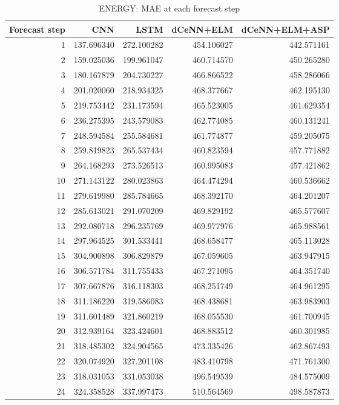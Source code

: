 \begin{table}
\caption{ENERGY: MAE at each forecast step}
\begin{tabular}{rrrrr}
\toprule
Forecast step & CNN & LSTM & dCeNN+ELM & dCeNN+ELM+ASP \\
\midrule
1 & 137.696340 & 272.100282 & 454.106027 & 442.571161 \\
2 & 159.025036 & 199.961047 & 460.714570 & 450.265280 \\
3 & 180.167879 & 204.730227 & 466.866522 & 458.286066 \\
4 & 201.020060 & 218.934325 & 468.377667 & 462.195130 \\
5 & 219.753442 & 231.173594 & 465.523005 & 461.629354 \\
6 & 236.275395 & 243.579083 & 462.774085 & 460.131241 \\
7 & 248.594584 & 255.584681 & 461.774877 & 459.205075 \\
8 & 259.819823 & 265.537434 & 460.823594 & 457.771882 \\
9 & 264.168293 & 273.526513 & 460.995083 & 457.421862 \\
10 & 271.143122 & 280.023863 & 464.474294 & 460.536662 \\
11 & 279.619980 & 285.784665 & 468.392170 & 464.201207 \\
12 & 285.613021 & 291.070209 & 469.829192 & 465.577607 \\
13 & 292.080718 & 296.235769 & 469.977976 & 465.988561 \\
14 & 297.964525 & 301.533441 & 468.658477 & 465.113028 \\
15 & 304.900898 & 306.829879 & 467.059605 & 463.947915 \\
16 & 306.571784 & 311.755433 & 467.271095 & 464.351740 \\
17 & 307.667876 & 316.118303 & 468.251749 & 464.961295 \\
18 & 311.186220 & 319.586083 & 468.438681 & 463.983903 \\
19 & 311.601489 & 321.860219 & 468.055530 & 461.700945 \\
20 & 312.939164 & 323.424601 & 468.883512 & 460.301985 \\
21 & 318.485302 & 324.904565 & 473.335426 & 462.867493 \\
22 & 320.074920 & 327.201108 & 483.410798 & 471.761300 \\
23 & 318.031053 & 331.053038 & 496.549539 & 484.575009 \\
24 & 324.358528 & 337.997473 & 510.564569 & 498.587873 \\
\bottomrule
\end{tabular}
\end{table}
